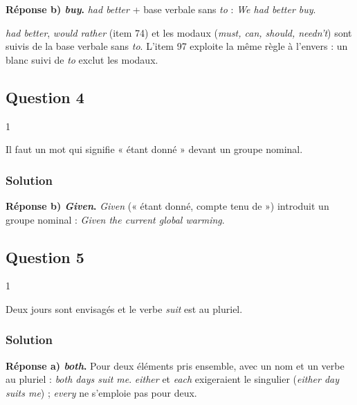 \documentclass[11pt,a4paper]{article}
\begin{document}
\textbf{Réponse b) \emph{buy}.} \emph{had better} + base verbale sans \emph{to} : \emph{We had better buy}.

\begin{methode}

\emph{had better}, \emph{would rather} (item 74) et les modaux (\emph{must, can, should, needn't}) sont suivis de la base verbale sans \emph{to}. L'item 97 exploite la même règle à l'envers : un blanc suivi de \emph{to} exclut les modaux.

\end{methode}

\hypertarget{question-4}{%
\subsection{Question 4}\label{question-4}}

\begin{indication}{1}

Il faut un mot qui signifie « étant donné » devant un groupe nominal.

\end{indication}

\hypertarget{solution-3}{%
\subsubsection{Solution}\label{solution-3}}

\textbf{Réponse b) \emph{Given}.} \emph{Given} (« étant donné, compte tenu de ») introduit un groupe nominal : \emph{Given the current global warming}.

\hypertarget{question-5}{%
\subsection{Question 5}\label{question-5}}

\begin{indication}{1}

Deux jours sont envisagés et le verbe \emph{suit} est au pluriel.

\end{indication}

\hypertarget{solution-4}{%
\subsubsection{Solution}\label{solution-4}}

\textbf{Réponse a) \emph{both}.} Pour deux éléments pris ensemble, avec un nom et un verbe au pluriel : \emph{both days suit me}. \emph{either} et \emph{each} exigeraient le singulier (\emph{either day suits me}) ; \emph{every} ne s'emploie pas pour deux.
\end{document}
